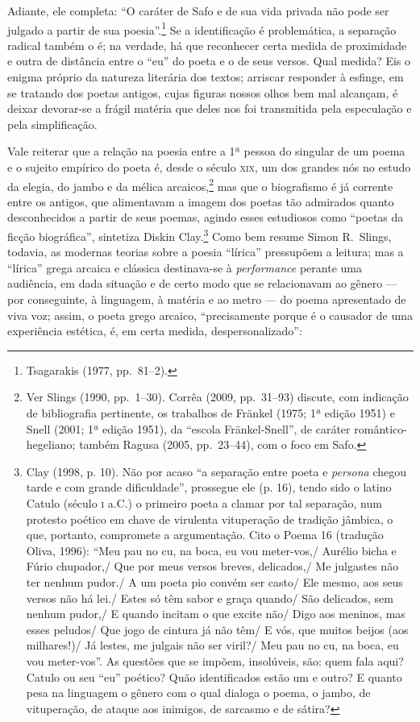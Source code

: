 Adiante, ele completa: “O caráter de Safo e de sua vida privada não pode ser
julgado a partir de sua poesia”.\footnote{ Tsagarakis (1977, pp.~81--2).} Se a identificação é problemática,
a separação radical também o é; na verdade, há que reconhecer certa medida de
proximidade e outra de distância entre o “eu” do poeta e o de seus versos. Qual
medida? Eis o enigma próprio da natureza literária dos textos; arriscar
responder à esfinge, em se tratando dos poetas antigos, cujas figuras nossos
olhos bem mal alcançam, é deixar devorar-se a frágil matéria que deles nos foi
transmitida pela especulação e pela simplificação.

Vale reiterar que a relação na poesia entre a 1ª pessoa do
singular de um poema e o sujeito empírico do poeta é, desde o século \textsc{xix}, um
dos grandes nós no estudo da elegia, do jambo e da mélica arcaicos,\footnote{
Ver Slings (1990, pp.~1--30). Corrêa (2009, pp.~31--93) discute, com indicação de
bibliografia pertinente, os trabalhos de Fränkel (1975; 1ª edição
1951) e Snell (2001; 1ª edição 1951), da “escola Fränkel-Snell”, de
caráter romântico-hegeliano; também Ragusa (2005, pp.~23--44), com o foco em
Safo.} mas que o biografismo é já corrente entre os antigos, que alimentavam a
imagem dos poetas tão admirados quanto desconhecidos a partir de seus poemas,
agindo esses estudiosos como “poetas da ficção biográfica”, sintetiza Diskin
Clay.\footnote{ Clay (1998, p. 10). Não por acaso “a separação entre poeta e
\textit{persona} chegou tarde e com grande dificuldade”, prossegue ele (p. 16),
tendo sido o latino Catulo (século \textsc{i} a.C.) o primeiro poeta a clamar por tal
separação, num protesto poético em chave de virulenta vituperação de tradição
jâmbica, o que, portanto, compromete a argumentação. Cito o Poema 16 (tradução
Oliva, 1996): ``Meu pau no cu, na boca, eu vou meter-vos,/ Aurélio bicha
e Fúrio chupador,/ Que por meus versos breves, delicados,/ Me julgastes não
ter nenhum pudor./ A um poeta pio convém ser casto/ Ele mesmo, aos seus
versos não há lei./ Estes só têm sabor e graça quando/ São delicados, sem
nenhum pudor,/ E quando incitam o que excite não/ Digo aos meninos, mas esses
peludos/ Que jogo de cintura já não têm/ E vós, que muitos beijos (aos
milhares!)/ Já lestes, me julgais não ser viril?/ Meu pau no cu, na boca, eu
vou meter-vos''. As questões que se impõem, insolúveis, são: quem fala
aqui? Catulo ou seu “eu” poético? Quão identificados estão um e outro? E quanto
pesa na linguagem o gênero com o qual dialoga o poema, o jambo, de vituperação,
de ataque aos inimigos, de sarcasmo e de sátira?} Como bem resume Simon R.~Slings, 
todavia, as modernas teorias sobre a poesia “lírica”
pressupõem a leitura; mas a “lírica” grega arcaica e clássica destinava-se à
\textit{performance} perante uma audiência, em dada situação e de certo modo
que se relacionavam ao gênero --- por conseguinte, à linguagem, à matéria e ao
metro --- do poema apresentado de viva voz; assim, o poeta grego arcaico,
“precisamente porque é o causador de uma experiência estética, é, em certa
medida, despersonalizado”:

